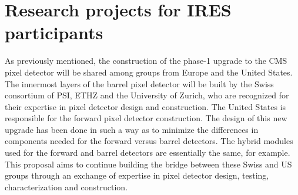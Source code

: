 \section{Research projects for IRES participants}
As previously mentioned, the construction of the phase-1 upgrade to
the CMS pixel detector will be shared among groups from Europe and the
United States.  The innermost layers of the barrel pixel detector will
be built by the Swiss consortium of PSI, ETHZ and the University of
Zurich, who are recognized for their expertise in pixel detector
design and construction.  The United States is responsible for the
forward pixel detector construction.  The design of this new upgrade
has been done in such a way as to minimize the differences in
components needed for the forward versus barrel detectors.  The hybrid
modules used for the forward and barrel detectors are essentially the
same, for example.  This proposal aims to continue building the bridge
between these Swiss and US groups through an exchange of expertise in
pixel detector design, testing, characterization and construction.

